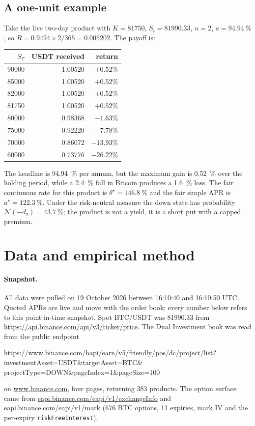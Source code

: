 \documentclass[11pt]{article}
\newcommand{\N}{\mathcal{N}}
\begin{document}
\subsection{A one-unit example}

Take the live two-day product with $K=\num{81750}$, $S_t=\num{81990.33}$, $n=2$, $a=\SI{94.94}{\percent}$, so $R=0.9494\times2/365=0.005202$. The payoff is:
\begin{center}
\begin{tabular}{rrr}
\toprule
$S_T$ & USDT received & return\\
\midrule
\num{90000} & 1.00520 & $+0.52\%$\\
\num{85000} & 1.00520 & $+0.52\%$\\
\num{82000} & 1.00520 & $+0.52\%$\\
\num{81750} & 1.00520 & $+0.52\%$\\
\num{80000} & 0.98368 & $-1.63\%$\\
\num{75000} & 0.92220 & $-7.78\%$\\
\num{70000} & 0.86072 & $-13.93\%$\\
\num{60000} & 0.73776 & $-26.22\%$\\
\bottomrule
\end{tabular}
\end{center}
The headline is \SI{94.94}{\percent} per annum, but the maximum gain is \SI{0.52}{\percent} over the holding period, while a \SI{2.4}{\percent} fall in Bitcoin produces a \SI{1.6}{\percent} loss. The fair continuous rate for this product is $\theta^\star=\SI{146.8}{\percent}$ and the fair simple APR is $a^\star=\SI{122.3}{\percent}$. Under the risk-neutral measure the down state has probability $\N(-d_2)=\SI{43.7}{\percent}$; the product is not a yield, it is a short put with a capped premium.

\section{Data and empirical method}\label{sec:data}

\paragraph{Snapshot.} All data were pulled on 19 October 2026 between 16:10:40 and 16:10:50 UTC. Quoted APRs are live and move with the order book; every number below refers to this point-in-time snapshot. Spot BTC/USDT was \num{81990.33} from \url{https://api.binance.com/api/v3/ticker/price}. The Dual Investment book was read from the public endpoint
\begin{flushleft}
\small\ttfamily
https://www.binance.com/bapi/earn/v5/friendly/pos/dc/project/list?\\
\quad investmentAsset=USDT\&targetAsset=BTC\&\\
\quad projectType=DOWN\&pageIndex=1\&pageSize=100
\end{flushleft}
on \url{www.binance.com}, four pages, returning 383 products. The option surface came from \url{eapi.binance.com/eapi/v1/exchangeInfo} and \url{eapi.binance.com/eapi/v1/mark} (676 BTC options, 11 expiries, mark IV and the per-expiry \texttt{riskFreeInterest}).
\end{document}
